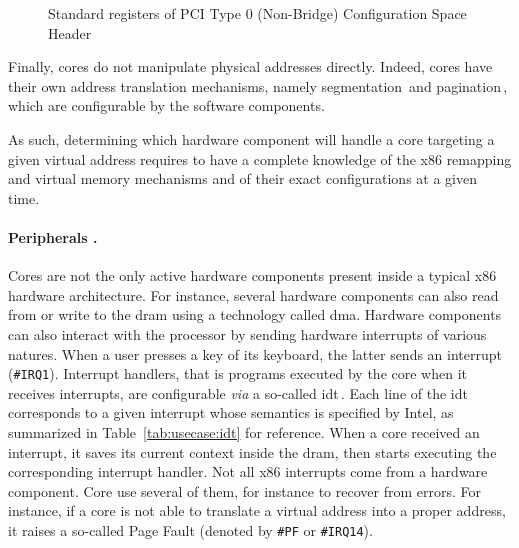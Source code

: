 \begin{figure}
  \begin{center}
    \def\svgwidth{0.8\textwidth} \resizebox{0.6\textwidth}{!}{%
      }
  \end{center}
  \caption{Standard registers of PCI Type 0 (Non-Bridge) Configuration Space
    Header}
  \label{fig:usecase:pciconfig}
\end{figure}

Finally, cores do not manipulate physical addresses directly.
%
Indeed, cores have their own address translation mechanisms, namely
segmentation\,\cite[Volume 3, Section 2.4]{intel2014manual} and
pagination\,\cite[Volume 3, Chapter 4]{intel2014manual}, which are configurable
by the software components.

As such, determining which hardware component will handle a core \IO targeting a
given virtual address requires to have a complete knowledge of the x86 remapping
and virtual memory mechanisms and of their exact configurations at a given time.

\paragraph{Peripherals \IOs.}
%
Cores are not the only active hardware components present inside a typical x86
hardware architecture.
%
For instance, several hardware components can also read from or write to the
\ac{dram} using a technology called \ac{dma}.
%
Hardware components can also interact with the processor by sending hardware
interrupts of various natures.
%
When a user presses a key of its keyboard, the latter sends an interrupt
(\texttt{\#IRQ1}).
%
Interrupt handlers, that is programs executed by the core when it receives
interrupts, are configurable \emph{via} a so-called \ac{idt}\,\cite[Volume 3,
Chapter 6]{intel2014manual}.
%
Each line of the \ac{idt} corresponds to a given interrupt whose semantics is
specified by Intel, as summarized in Table~\ref{tab:usecase:idt} for reference.
%
When a core received an interrupt, it saves its current context inside the
\ac{dram}, then starts executing the corresponding interrupt handler.
%
Not all x86 interrupts come from a hardware component.
%
Core use several of them, for instance to recover from errors.
%
For instance, if a core is not able to translate a virtual address into a
proper address, it raises a so-called Page Fault (denoted by \texttt{\#PF} or
\texttt{\#IRQ14}).

